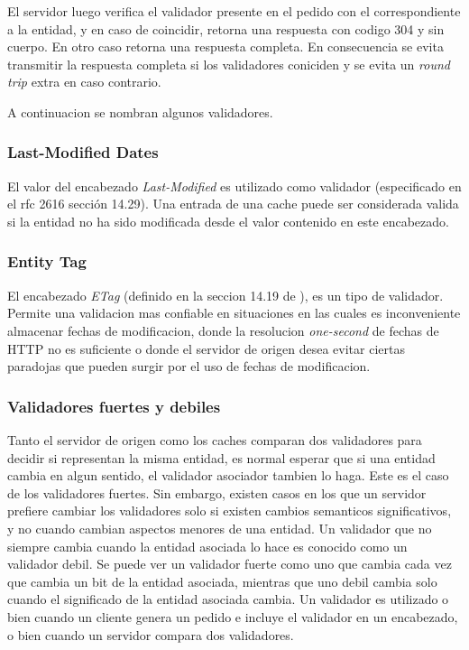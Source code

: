 El servidor luego verifica el validador presente en el pedido con el correspondiente a la entidad, y en caso de coincidir, retorna una respuesta con codigo 304
y sin cuerpo. En otro caso retorna una respuesta completa. En consecuencia se evita transmitir la respuesta completa si los validadores coniciden y se evita un \emph{round trip}
extra en caso contrario.

A continuacion se nombran algunos validadores.

\subsubsection{Last-Modified Dates}
El valor del encabezado \emph{Last-Modified} es utilizado como validador (especificado en el rfc 2616 \cite{rfc2616} sección 14.29). Una entrada de una cache puede ser
considerada valida si la entidad no ha sido modificada desde el valor contenido en este encabezado.

\subsubsection{Entity Tag}
El encabezado \emph{ETag} (definido en la seccion 14.19 de \cite{rfc2616}), es un tipo de validador. Permite una validacion mas confiable en situaciones en las cuales es inconveniente almacenar
fechas de modificacion, donde la resolucion \emph{one-second} de fechas de HTTP no es suficiente o donde el servidor de origen desea evitar ciertas paradojas que pueden surgir por el uso de
fechas de modificacion.

\subsubsection{Validadores fuertes y debiles}
Tanto el servidor de origen como los caches comparan dos validadores para decidir si representan la misma entidad, es normal esperar que si una entidad cambia en algun
sentido, el validador asociador tambien lo haga. Este es el caso de los validadores fuertes.
Sin embargo, existen casos en los que un servidor prefiere cambiar los validadores solo si existen cambios semanticos significativos, y no cuando cambian aspectos menores
de una entidad. Un validador que no siempre cambia cuando la entidad asociada lo hace es conocido como un validador debil.
Se puede ver un validador fuerte como uno que cambia cada vez que cambia un bit de la entidad asociada, mientras que uno debil cambia solo cuando el significado de la
entidad asociada cambia.
Un validador es utilizado o bien cuando un cliente genera un pedido e incluye el validador en un encabezado, o bien cuando un servidor compara dos validadores.


